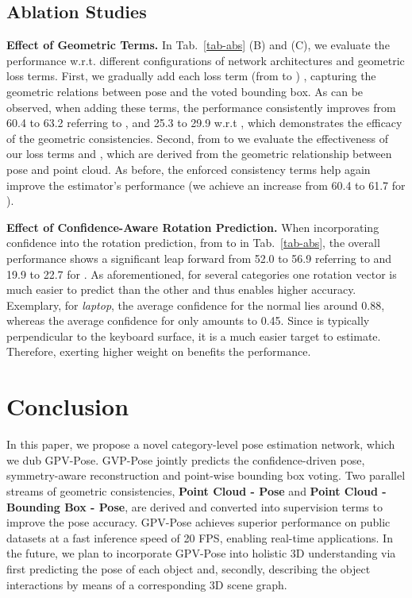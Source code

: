 \documentclass[10pt,twocolumn,letterpaper]{article}
\begin{document}
\subsection{Ablation Studies}


\textbf{Effect of Geometric Terms.} 
In Tab.~\ref{tab-abs} (B) and (C), we evaluate the performance w.r.t. different configurations of network architectures and geometric loss terms.
First, we gradually add each loss term (from  to ) , capturing the geometric relations between pose and the voted bounding box.
As can be observed, when adding these terms, the performance consistently improves from 60.4 to 63.2 referring to , and 25.3 to 29.9 w.r.t , which demonstrates the efficacy of the geometric consistencies.
Second, from  to  we evaluate the effectiveness of our loss terms  and , which are derived from the geometric relationship between pose and point cloud.
As before, the enforced consistency terms help again improve the estimator's performance (\ie we achieve an increase from 60.4 to 61.7 for ).

\textbf{Effect of Confidence-Aware Rotation Prediction.}
When incorporating confidence into the rotation prediction, from  to  in Tab.~\ref{tab-abs}, the overall performance shows a significant leap forward from 52.0 to 56.9 referring to  and 19.9 to 22.7 for .
As aforementioned, for several categories one rotation vector is much easier to predict than the other and thus enables higher accuracy.
Exemplary, for \textit{laptop}, the average confidence for the  normal lies around 0.88, whereas the average confidence for  only amounts to 0.45. 
Since  is typically perpendicular to the keyboard surface, it is a much easier target to estimate.
Therefore, exerting higher weight on  benefits the performance.


 \section{Conclusion}
In this paper, we propose a novel category-level pose estimation network, which we dub GPV-Pose.
GVP-Pose jointly predicts the confidence-driven pose, symmetry-aware reconstruction and point-wise bounding box voting.
Two parallel streams of geometric consistencies, \textbf{Point Cloud - Pose} and \textbf{Point Cloud - Bounding Box - Pose}, are derived and converted into supervision terms to improve the pose accuracy.
GPV-Pose achieves superior performance on public datasets at a fast inference speed of 20 FPS, enabling real-time applications. 
In the future, we plan to incorporate GPV-Pose into holistic 3D understanding via first predicting the pose of each object and, secondly, describing the object interactions by means of a corresponding 3D scene graph. {\small


}
\end{document}
